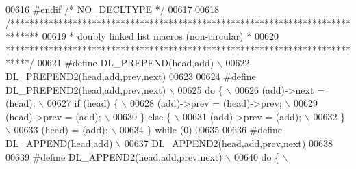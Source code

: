 \begin{DoxyCode}
00616 \textcolor{preprocessor}{#endif }\textcolor{comment}{/* NO\_DECLTYPE */}\textcolor{preprocessor}{}
00617 
00618 \textcolor{comment}{/******************************************************************************}
00619 \textcolor{comment}{ * doubly linked list macros (non-circular)                                   *}
00620 \textcolor{comment}{ *****************************************************************************/}
00621 \textcolor{preprocessor}{#define DL\_PREPEND(head,add)                                                                   \(\backslash\)}
00622 \textcolor{preprocessor}{    DL\_PREPEND2(head,add,prev,next)}
00623 
00624 \textcolor{preprocessor}{#define DL\_PREPEND2(head,add,prev,next)                                                        \(\backslash\)}
00625 \textcolor{preprocessor}{do \{                                                                                           \(\backslash\)}
00626 \textcolor{preprocessor}{ (add)->next = (head);                                                                         \(\backslash\)}
00627 \textcolor{preprocessor}{ if (head) \{                                                                                   \(\backslash\)}
00628 \textcolor{preprocessor}{   (add)->prev = (head)->prev;                                                                 \(\backslash\)}
00629 \textcolor{preprocessor}{   (head)->prev = (add);                                                                       \(\backslash\)}
00630 \textcolor{preprocessor}{ \} else \{                                                                                      \(\backslash\)}
00631 \textcolor{preprocessor}{   (add)->prev = (add);                                                                        \(\backslash\)}
00632 \textcolor{preprocessor}{ \}                                                                                             \(\backslash\)}
00633 \textcolor{preprocessor}{ (head) = (add);                                                                               \(\backslash\)}
00634 \textcolor{preprocessor}{\} while (0)}
00635 
00636 \textcolor{preprocessor}{#define DL\_APPEND(head,add)                                                                    \(\backslash\)}
00637 \textcolor{preprocessor}{    DL\_APPEND2(head,add,prev,next)}
00638 
00639 \textcolor{preprocessor}{#define DL\_APPEND2(head,add,prev,next)                                                         \(\backslash\)}
00640 \textcolor{preprocessor}{do \{                                                                                           \(\backslash\)}

\end{DoxyCode}
